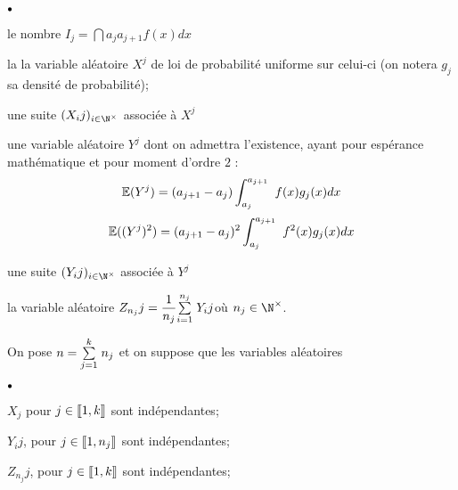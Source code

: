 \documentclass[11pt]{article}%
\begin{document}
\begin{noliste}{$\scriptstyle \bullet$}
\item le nombre $I_{j} = \dint{a_{j}}{a_{j + 1}}f(x)dx$

\item la la variable aléatoire $X^{j}$ de loi de probabilité uniforme
sur
celui-ci (on notera $g_{j}$ sa densité de probabilité);

\item une suite $(X_{i}{j})_{i\in \N^{\times }}$ associée à $X^{j}$

\item une variable aléatoire $Y^{j}$ dont on admettra l'existence,
ayant
pour espérance mathématique et pour moment d'ordre $2$ : 
\[
\mathbb{E}(Y^{j}) = (a_{j + 1}-a_{j})\displaystyle \int_{a_{j}}^{a_{j + 1}}\ f(x)g_{j}(x)dx
\]
\[
\mathbb{E}((Y^{j})^{2}) = (a_{j + 1}-a_{j})^{2}\displaystyle \int_{a_{j}}^{a_{j +
1}}\ f^{2}(x)g_{j}(x)dx
\]

\item une suite $(Y_{i}{j})_{i\in \N^{\times }}$ associée à $Y^{j}$

\item la variable aléatoire $Z_{n_{j}}{j} = {\dfrac{1}{n_{j}}}{\textstyle\sum\limits_{i =
1}^{n_{j}}}\hspace{.1cm}Y_{i}{j}$\quad où $n_{j}\in \N^{\times }$.
\end{noliste}

\noindent On pose $n = {\textstyle\sum\limits_{j = 1}^{k}}\hspace{.1cm}n_{j}$ et on suppose que les
variables aléatoires

\begin{noliste}{$\scriptstyle \bullet$}
\item $X_{j}$ pour $j\in \lbrack
\hspace{-0.15em}[1,k]\hspace{-0.13em}]$
sont indépendantes;

\item $Y_{i}{j}$, pour $j\in \lbrack
\hspace{-0.15em}[1,n_{j}]\hspace{-0.13em}]$ sont indépendantes;

\item $Z_{n_{j}}{j}$, pour $j\in \lbrack
\hspace{-0.15em}[1,k]\hspace{-0.13em}]$ sont indépendantes;
\end{noliste}
\end{document}
